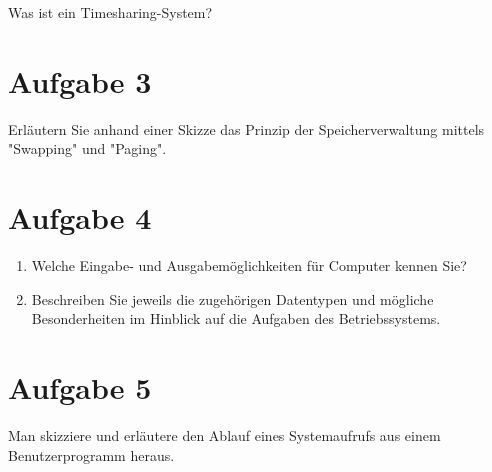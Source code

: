 Was ist ein Timesharing-System?

\section{Aufgabe 3}

Erläutern Sie anhand einer Skizze das Prinzip der Speicherverwaltung mittels "Swapping" und "Paging".

\section{Aufgabe 4}

\begin{enumerate}
    \item Welche Eingabe- und Ausgabemöglichkeiten für Computer kennen Sie?
    \item Beschreiben Sie jeweils die zugehörigen Datentypen und mögliche Besonderheiten im Hinblick auf die Aufgaben des Betriebssystems.
\end{enumerate}

\section{Aufgabe 5}

Man skizziere und erläutere den Ablauf eines Systemaufrufs aus einem Benutzerprogramm heraus.